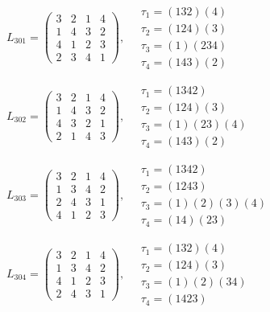 $L_{301} = \begin{pmatrix} 3 & 2 & 1 & 4 \\ 1 & 4 & 3 & 2 \\ 4 & 1 & 2 & 3 \\ 2 & 3 & 4 & 1 \end{pmatrix}, \quad \begin{matrix} \tau_{1} = (1 3 2)(4) \\ \tau_{2} = (1 2 4)(3) \\ \tau_{3} = (1)(2 3 4) \\ \tau_{4} = (1 4 3)(2) \end{matrix}$

$L_{302} = \begin{pmatrix} 3 & 2 & 1 & 4 \\ 1 & 4 & 3 & 2 \\ 4 & 3 & 2 & 1 \\ 2 & 1 & 4 & 3 \end{pmatrix}, \quad \begin{matrix} \tau_{1} = (1 3 4 2) \\ \tau_{2} = (1 2 4)(3) \\ \tau_{3} = (1)(2 3)(4) \\ \tau_{4} = (1 4 3)(2) \end{matrix}$

$L_{303} = \begin{pmatrix} 3 & 2 & 1 & 4 \\ 1 & 3 & 4 & 2 \\ 2 & 4 & 3 & 1 \\ 4 & 1 & 2 & 3 \end{pmatrix}, \quad \begin{matrix} \tau_{1} = (1 3 4 2) \\ \tau_{2} = (1 2 4 3) \\ \tau_{3} = (1)(2)(3)(4) \\ \tau_{4} = (1 4)(2 3) \end{matrix}$

$L_{304} = \begin{pmatrix} 3 & 2 & 1 & 4 \\ 1 & 3 & 4 & 2 \\ 4 & 1 & 2 & 3 \\ 2 & 4 & 3 & 1 \end{pmatrix}, \quad \begin{matrix} \tau_{1} = (1 3 2)(4) \\ \tau_{2} = (1 2 4)(3) \\ \tau_{3} = (1)(2)(3 4) \\ \tau_{4} = (1 4 2 3) \end{matrix}$

